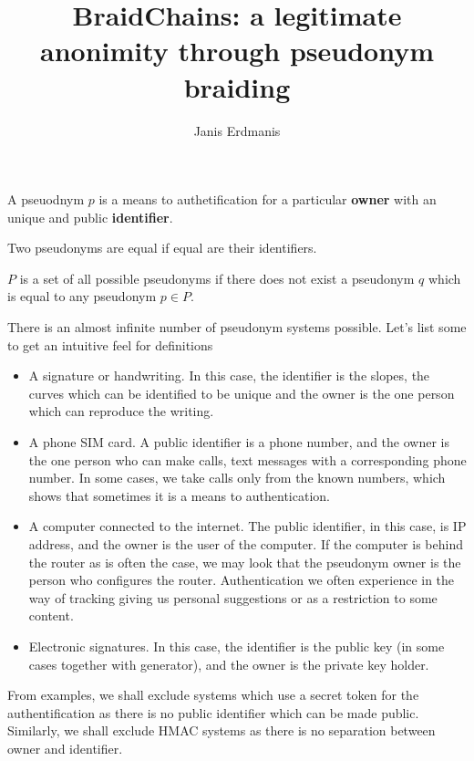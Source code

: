 \documentclass[12pt]{article}
\newenvironment{definition}[2][Definition]{\begin{trivlist}
\item[\hskip \labelsep {\bfseries #1}\hskip \labelsep {\bfseries #2.}]}{\end{trivlist}}
\begin{document}

\title{BraidChains: a legitimate anonimity through pseudonym braiding} %
\author{Janis Erdmanis} %

\maketitle

\begin{definition}{(pseudonym)} 
A pseuodnym $p$ is a means to authetification for a particular {\bf owner} with an unique and public {\bf identifier}.
\end{definition}

\begin{definition}{(pseudonym equality)}
  Two pseudonyms are equal if equal are their identifiers.
\end{definition}

\begin{definition}{(pseudonym set)}
  $P$ is a set of all possible pseudonyms if there does not exist a pseudonym $q$ which is equal to any pseudonym $p \in P$.
\end{definition}

There is an almost infinite number of pseudonym systems possible. Let's list some to get an intuitive feel for definitions
\begin{itemize}
\item A signature or handwriting. In this case, the identifier is the slopes, the curves which can be identified to be unique and the owner is the one person which can reproduce the writing. 
\item A phone SIM card. A public identifier is a phone number, and the owner is the one person who can make calls, text messages with a corresponding phone number. In some cases, we take calls only from the known numbers, which shows that sometimes it is a means to authentication.
\item A computer connected to the internet. The public identifier, in this case, is IP address, and the owner is the user of the computer. If the computer is behind the router as is often the case, we may look that the pseudonym owner is the person who configures the router. Authentication we often experience in the way of tracking giving us personal suggestions or as a restriction to some content. 
\item Electronic signatures. In this case, the identifier is the public key (in some cases together with generator), and the owner is the private key holder. 
\end{itemize}
From examples, we shall exclude systems which use a secret token for the authentification as there is no public identifier which can be made public. Similarly, we shall exclude HMAC systems as there is no separation between owner and identifier. 
\end{document}

